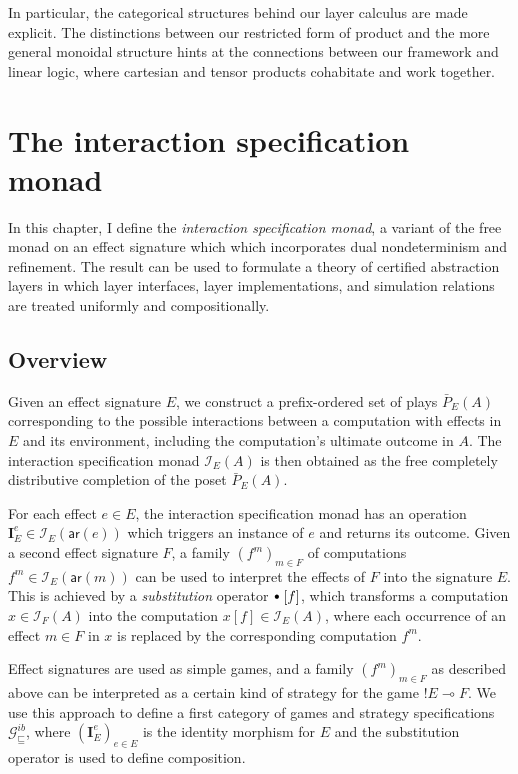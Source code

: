 \documentclass[11pt,oneside,draft]{book}
\theoremstyle{definition}
\newcommand{\gcat}{\mathcal{G}_{\sqsubseteq}}
\newcommand{\kw}[1]{\ensuremath{ \mathsf{#1} }}
\newcommand{\sbt}{\,\begin{picture}(-1,1)(-1,-3)\circle*{3}\end{picture}\ }
\begin{document}
In particular,
the categorical structures behind our layer calculus
are made explicit.
The distinctions between our restricted form of product
and the more general monoidal structure
hints at the connections between our framework
and linear logic,
where cartesian and tensor products cohabitate
and work together.



\chapter{The interaction specification monad} \label{sec:intspec} %

In this chapter,
I define the \emph{interaction specification monad},
a variant of the free monad on an effect signature which
which incorporates dual nondeterminism and refinement.
The result can be used to formulate a theory of certified abstraction
layers in which
layer interfaces, layer implementations, and simulation relations
are treated uniformly and compositionally.

\section{Overview} %

Given an effect signature $E$,
we construct a prefix-ordered set of plays $\bar{P}_E(A)$
corresponding to the possible interactions between
a computation with effects in $E$
and its environment,
including the computation's ultimate outcome in $A$.
The interaction specification monad $\mathcal{I}_E(A)$ is then obtained
as the free completely distributive completion of the poset $\bar{P}_E(A)$.

For each effect $e \in E$,
the interaction specification monad
has an operation
$\mathbf{I}_E^e \in \mathcal{I}_E(\kw{ar}(e))$
which triggers an instance of $e$ and returns its outcome.
Given a second effect signature $F$,
a family $(f^m)_{m \in F}$ of computations
$f^m \in \mathcal{I}_E(\kw{ar}(m))$
can be used to interpret the effects of $F$
into the signature $E$.
This is achieved by a \emph{substitution} operator $\sbt\ [f]$,
which transforms a computation $x \in \mathcal{I}_F(A)$
into the computation $x[f] \in \mathcal{I}_E(A)$,
where each occurrence of an effect $m \in F$ in $x$
is replaced by the corresponding computation $f^m$.

Effect signatures are used as
simple games,
and a family $(f^m)_{m \in F}$ as described above
can be interpreted as
a certain kind of strategy for the game ${!E} \multimap F$.
We use this approach to define
a first category of games and strategy specifications $\gcat^{ib}$,
where $(\mathbf{I}_E^e)_{e \in E}$ is %
the identity morphism for $E$ and
the substitution operator
is used to define composition.
\end{document}

